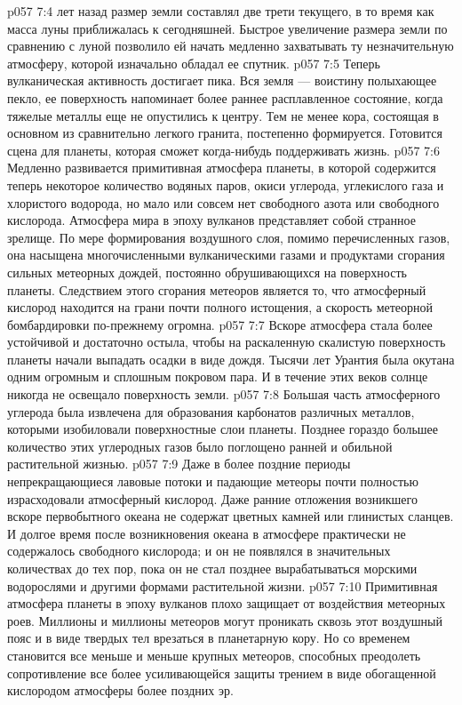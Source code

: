 \vs p057 7:4 \pc {} лет назад размер земли составлял две трети текущего, в то время как масса луны приближалась к сегодняшней. Быстрое увеличение размера земли по сравнению с луной позволило ей начать медленно захватывать ту незначительную атмосферу, которой изначально обладал ее спутник.
\vs p057 7:5 Теперь вулканическая активность достигает пика. Вся земля --- воистину полыхающее пекло, ее поверхность напоминает более раннее расплавленное состояние, когда тяжелые металлы еще не опустились к центру.  Тем не менее кора, состоящая в основном из сравнительно легкого гранита, постепенно формируется. Готовится сцена для планеты, которая сможет когда\hyp{}нибудь поддерживать жизнь.
\vs p057 7:6 \pc Медленно развивается примитивная атмосфера планеты, в которой содержится теперь некоторое количество водяных паров, окиси углерода, углекислого газа и хлористого водорода, но мало или совсем нет свободного азота или свободного кислорода. Атмосфера мира в эпоху вулканов представляет собой странное зрелище. По мере формирования воздушного слоя, помимо перечисленных газов, она насыщена многочисленными вулканическими газами и продуктами сгорания сильных метеорных дождей, постоянно обрушивающихся на поверхность планеты. Следствием этого сгорания метеоров является то, что атмосферный кислород находится на грани почти полного истощения, а скорость метеорной бомбардировки по\hyp{}прежнему огромна.
\vs p057 7:7 \pc Вскоре атмосфера стала более устойчивой и достаточно остыла, чтобы на раскаленную скалистую поверхность планеты начали выпадать осадки в виде дождя. Тысячи лет Урантия была окутана одним огромным и сплошным покровом пара. И в течение этих веков солнце никогда не освещало поверхность земли.
\vs p057 7:8 Большая часть атмосферного углерода была извлечена для образования карбонатов различных металлов, которыми изобиловали поверхностные слои планеты. Позднее гораздо большее количество этих углеродных газов было поглощено ранней и обильной растительной жизнью.
\vs p057 7:9 Даже в более поздние периоды непрекращающиеся лавовые потоки и падающие метеоры почти полностью израсходовали атмосферный кислород. Даже ранние отложения возникшего вскоре первобытного океана не содержат цветных камней или глинистых сланцев. И долгое время после возникновения океана в атмосфере практически не содержалось свободного кислорода; и он не появлялся в значительных количествах до тех пор, пока он не стал позднее вырабатываться морскими водорослями и другими формами растительной жизни.
\vs p057 7:10 Примитивная атмосфера планеты в эпоху вулканов плохо защищает от воздействия метеорных роев. Миллионы и миллионы метеоров могут проникать сквозь этот воздушный пояс и в виде твердых тел врезаться в планетарную кору. Но со временем становится все меньше и меньше крупных метеоров, способных преодолеть сопротивление все более усиливающейся защиты трением в виде обогащенной кислородом атмосферы более поздних эр.
